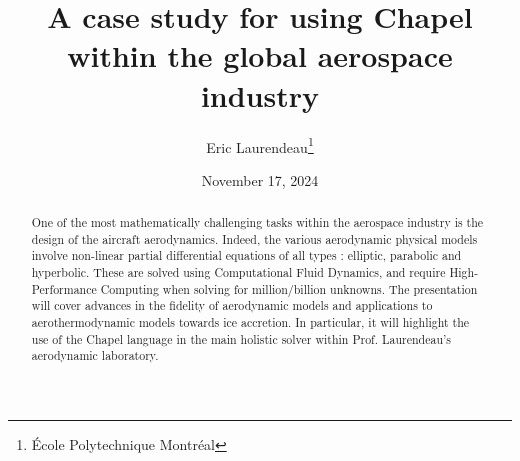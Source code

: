 \documentclass{article}
\title{A case study for using Chapel within the global aerospace industry}
\author{Eric Laurendeau\thanks{École Polytechnique Montréal}}
\date{November 17, 2024}
\providecommand{\keywords}[1]{\textbf{\textit{Keywords---}} #1}
\begin{document}
\maketitle

\begin{abstract}
    One of the most mathematically challenging tasks within the aerospace industry is the design of the aircraft aerodynamics. Indeed, the various aerodynamic physical models involve non-linear partial differential equations of all types : elliptic, parabolic and hyperbolic. These are solved using Computational Fluid Dynamics, and require High-Performance Computing when solving for million/billion unknowns. The presentation will cover advances in the fidelity of aerodynamic models and applications to aerothermodynamic models towards ice accretion. In particular, it will highlight the use of the Chapel language in the main holistic solver within Prof. Laurendeau’s aerodynamic laboratory.    
\end{abstract}

\end{document}
